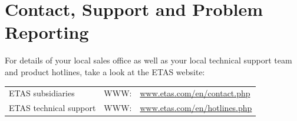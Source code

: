 \chapter{Contact, Support and Problem Reporting}
For details of your local sales office as well as your local technical support team and product hotlines, take a look at the ETAS website:

\begin{tabular}{ l l l }
ETAS subsidiaries & WWW: & \url{www.etas.com/en/contact.php}\\
ETAS technical support & WWW: & \url{www.etas.com/en/hotlines.php}\\
\end{tabular}